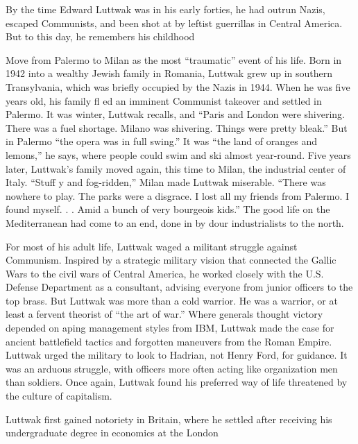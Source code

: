  \par 
By the time Edward Luttwak was in his early forties, he had outrun Nazis, escaped Communists, and been shot at by leftist guerrillas in Central America. But to this day, he remembers his childhood
 \par 
Move from Palermo to Milan as the most “traumatic” event of his life. Born in 1942 into a wealthy Jewish family in Romania, Luttwak grew up in southern Transylvania, which was briefly occupied by the Nazis in 1944. When he was five years old, his family fl ed an imminent Communist takeover and settled in Palermo. It was winter, Luttwak recalls, and “Paris and London were shivering. There was a fuel shortage. Milano was shivering. Things were pretty bleak.” But in Palermo “the opera was in full swing.” It was “the land of oranges and lemons,” he says, where people could swim and ski almost year-round. Five years later, Luttwak’s family moved again, this time to Milan, the industrial center of Italy. “Stuff y and fog-ridden,” Milan made Luttwak miserable. “There was nowhere to play. The parks were a disgrace. I lost all my friends from Palermo. I found myself. . . Amid a bunch of very bourgeois kids.” The good life on the Mediterranean had come to an end, done in by dour industrialists to the north.
 \par 
For most of his adult life, Luttwak waged a militant struggle against Communism. Inspired by a strategic military vision that connected the Gallic Wars to the civil wars of Central America, he worked closely with the U.S. Defense Department as a consultant, advising everyone from junior officers to the top brass. But Luttwak was more than a cold warrior. He was a warrior, or at least a fervent theorist of “the art of war.” Where generals thought victory depended on aping management styles from IBM, Luttwak made the case for ancient battlefield tactics and forgotten maneuvers from the Roman Empire. Luttwak urged the military to look to Hadrian, not Henry Ford, for guidance. It was an arduous struggle, with officers more often acting like organization men than soldiers. Once again, Luttwak found his preferred way of life threatened by the culture of capitalism.
 \par 
Luttwak first gained notoriety in Britain, where he settled after receiving his undergraduate degree in economics at the London
 \par 
